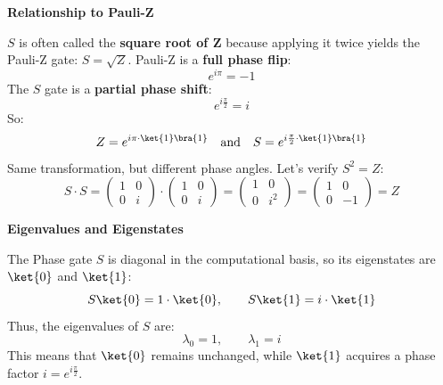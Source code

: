 \highspace
\begin{flushleft}
    \textcolor{Green3}{ \textbf{Relationship to Pauli-Z}}
\end{flushleft}
$S$ is often called the \textbf{square root of Z} because applying it twice yields the Pauli-Z gate: $S = \sqrt{Z}$. Pauli-Z is a \textbf{full phase flip}:
\begin{equation*}
    e^{i\pi} = -1
\end{equation*}
The $S$ gate is a \textbf{partial phase shift}:
\begin{equation*}
    e^{i\frac{\pi}{2}} = i
\end{equation*}
So:
\begin{equation*}
    Z = e^{i \pi \cdot \ket{1}\bra{1}} \quad\text{and}\quad S = e^{i \frac{\pi}{2} \cdot \ket{1}\bra{1}}
\end{equation*}
Same transformation, but different phase angles. Let's verify $S^{2} = Z$:
\begin{equation*}
    S \cdot S = 
    \begin{pmatrix}
        1 & 0 \\ 0 & i
    \end{pmatrix}
    \cdot
    \begin{pmatrix}
        1 & 0 \\ 0 & i
    \end{pmatrix}
    =
    \begin{pmatrix}
        1 & 0 \\ 0 & i^{2}
    \end{pmatrix}
    =
    \begin{pmatrix}
        1 & 0 \\ 0 & -1
    \end{pmatrix}
    = Z
\end{equation*}

\begin{flushleft}
    \textcolor{Green3}{ \textbf{Eigenvalues and Eigenstates}}
\end{flushleft}
The Phase gate $S$ is diagonal in the computational basis, so its eigenstates are $\ket{0}$ and $\ket{1}$:
\begin{equation*}
    S\ket{0} = 1 \cdot \ket{0}, \hspace{2em} S\ket{1} = i \cdot \ket{1}
\end{equation*}
Thus, the eigenvalues of $S$ are:
\begin{equation*}
    \lambda_{0} = 1, \hspace{2em} \lambda_{1} = i
\end{equation*}
This means that $\ket{0}$ remains unchanged, while $\ket{1}$ acquires a phase factor $i = e^{i\frac{\pi}{2}}$.

